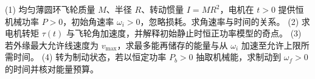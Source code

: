 (1) 均匀薄圆环飞轮质量 \(M\)、半径 \(R\)、转动惯量 \(I=MR^2\)，电机在 \(t>0\) 提供恒机械功率 \(P>0\)，初始角速率 \(\omega_i>0\)，忽略损耗。求角速率与时间的关系。
(2) 求电机转矩 \(\tau(t)\) 与飞轮角加速度，并解释初始静止时恒正功率模型的奇点。
(3) 若外缘最大允许线速度为 \(v_{\max}\)，求最多能再储存的能量与从 \(\omega_i\) 加速至允许上限所需时间。
(4) 转为制动状态，若以恒定功率 \(P_b>0\) 抽取机械能，求制动到 \(\omega_f>0\) 的时间并核对能量预算。
